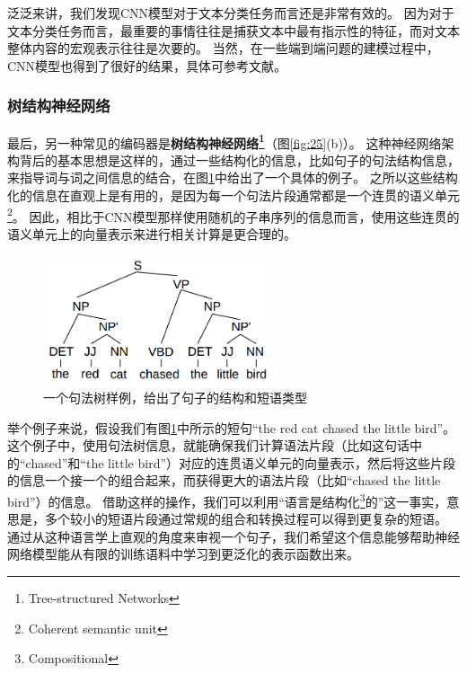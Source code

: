 \documentclass[10pt,a4paper]{ctexart}
\begin{document}
泛泛来讲，我们发现CNN模型对于文本分类任务而言还是非常有效的。
因为对于文本分类任务而言，最重要的事情往往是捕获文本中最有指示性的特征，而对文本整体内容的宏观表示往往是次要的\cite{kim2014convolutional}。
当然，在一些端到端问题的建模过程中，CNN模型也得到了很好的结果，具体可参考文献\cite{kalchbrenner2016neural}。

\subsubsection{树结构神经网络}
最后，另一种常见的编码器是\textbf{树结构神经网络\footnote{Tree-structured Networks}}（\cite{pollack1990recursive,socher2011parsing}图\ref{fig:25}(b)）。
这种神经网络架构背后的基本思想是这样的，通过一些结构化的信息，比如句子的句法结构信息，来指导词与词之间信息的结合，在图\ref{fig:26}中给出了一个具体的例子。
之所以这些结构化的信息在直观上是有用的，是因为每一个句法片段通常都是一个连贯的语义单元\footnote{Coherent semantic unit}。
因此，相比于CNN模型那样使用随机的子串序列的信息而言，使用这些连贯的语义单元上的向量表示来进行相关计算是更合理的。

\begin{figure}[H]
\centering
\includegraphics[width=0.6\textwidth]{fig26.png}
\caption{一个句法树样例，给出了句子的结构和短语类型}
\label{fig:26}
\end{figure}

举个例子来说，假设我们有图\ref{fig:26}中所示的短句“the red cat chased the little bird”。
这个例子中，使用句法树信息，就能确保我们计算语法片段（比如这句话中的“chased”和“the little bird”）对应的连贯语义单元的向量表示，然后将这些片段的信息一个接一个的组合起来，而获得更大的语法片段（比如“chased the little bird”）的信息。
借助这样的操作，我们可以利用“语言是结构化\footnote{Compositional}的”这一事实，意思是，多个较小的短语片段通过常规的组合和转换过程可以得到更复杂的短语\cite{szabo2010compositionality}。
通过从这种语言学上直观的角度来审视一个句子，我们希望这个信息能够帮助神经网络模型能从有限的训练语料中学习到更泛化的表示函数出来。
\end{document}
